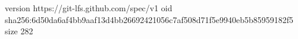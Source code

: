 version https://git-lfs.github.com/spec/v1
oid sha256:6d50da6af4bb9aaf13d4bb26692421056c7af508d71f5e9940eb5b85959182f5
size 282
